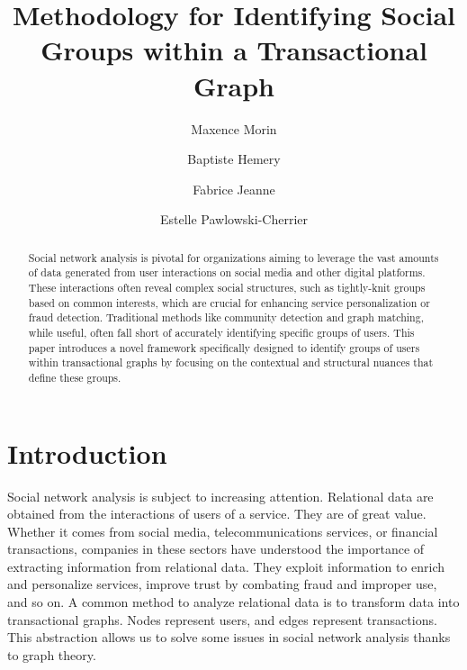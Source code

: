 \documentclass{llncs}
\begin{document}
\title{Methodology for Identifying Social Groups within a Transactional Graph}

\author{Maxence Morin \and
Baptiste Hemery \and
Fabrice Jeanne \and
Estelle Pawlowski-Cherrier}



\maketitle

\begin{abstract}
Social network analysis is pivotal for organizations aiming to leverage the vast amounts of data generated from user interactions on social media and other digital platforms.
These interactions often reveal complex social structures, such as tightly-knit groups based on common interests, which are crucial for enhancing service personalization or fraud detection.
Traditional methods like community detection and graph matching, while useful, often fall short of accurately identifying specific groups of users.
This paper introduces a novel framework specifically designed to identify groups of users within transactional graphs by focusing on the contextual and structural nuances that define these groups.
\end{abstract}

\section{Introduction}
Social network analysis is subject to increasing attention.
Relational data are obtained from the interactions of users of a service.
They are of great value.
Whether it comes from social media, telecommunications services, or financial transactions, companies in these sectors have understood the importance of extracting information from relational data.
They exploit information to enrich and personalize services, improve trust by combating fraud and improper use, and so on.
A common method to analyze relational data is to transform data into transactional graphs.
Nodes represent users, and edges represent transactions.
This abstraction allows us to solve some issues in social network analysis thanks to graph theory.
\end{document}
